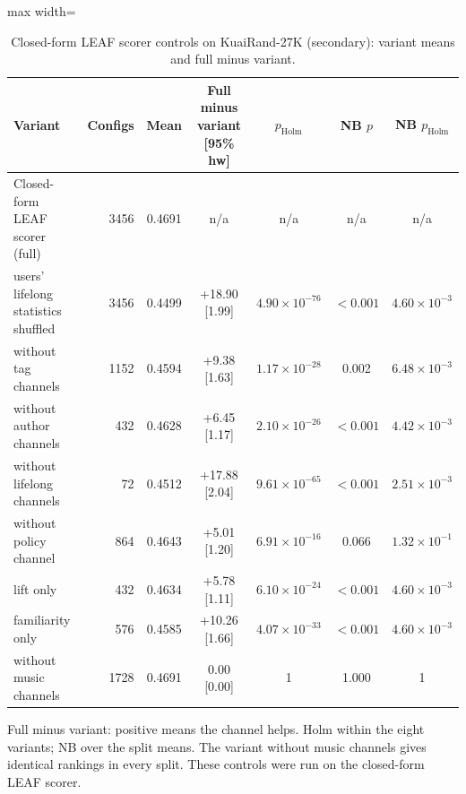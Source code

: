 \begin{table}[tbp]
\centering
\footnotesize
\caption{Closed-form LEAF scorer controls on KuaiRand-27K (secondary): variant means and full minus variant.}
\label{tab:leafctl}
\begin{adjustbox}{max width=\linewidth}
\begin{tabular}{lrccccc}
\toprule
Variant & Configs & Mean & Full minus variant [95\% hw] & $p_{\mathrm{Holm}}$ & NB $p$ & NB $p_{\mathrm{Holm}}$ \\
\midrule
Closed-form LEAF scorer (full) & 3456 & 0.4691 & n/a & n/a & n/a & n/a \\
\midrule
users' lifelong statistics shuffled & 3456 & 0.4499 & +18.90 [1.99] & $4.90\times10^{-76}$ & $<0.001$ & $4.60\times10^{-3}$ \\
without tag channels & 1152 & 0.4594 & +9.38 [1.63] & $1.17\times10^{-28}$ & 0.002 & $6.48\times10^{-3}$ \\
without author channels & 432 & 0.4628 & +6.45 [1.17] & $2.10\times10^{-26}$ & $<0.001$ & $4.42\times10^{-3}$ \\
without lifelong channels & 72 & 0.4512 & +17.88 [2.04] & $9.61\times10^{-65}$ & $<0.001$ & $2.51\times10^{-3}$ \\
without policy channel & 864 & 0.4643 & +5.01 [1.20] & $6.91\times10^{-16}$ & 0.066 & $1.32\times10^{-1}$ \\
lift only & 432 & 0.4634 & +5.78 [1.11] & $6.10\times10^{-24}$ & $<0.001$ & $4.60\times10^{-3}$ \\
familiarity only & 576 & 0.4585 & +10.26 [1.66] & $4.07\times10^{-33}$ & $<0.001$ & $4.60\times10^{-3}$ \\
without music channels & 1728 & 0.4691 & 0.00 [0.00] & 1 & 1.000 & 1 \\
\bottomrule
\end{tabular}
\end{adjustbox}
\par\smallskip
\begin{minipage}{\linewidth}\raggedright\footnotesize Full minus variant: positive means the channel helps. Holm within the eight variants; NB over the split means. The variant without music channels gives identical rankings in every split. These controls were run on the closed-form LEAF scorer.\end{minipage}
\end{table}
